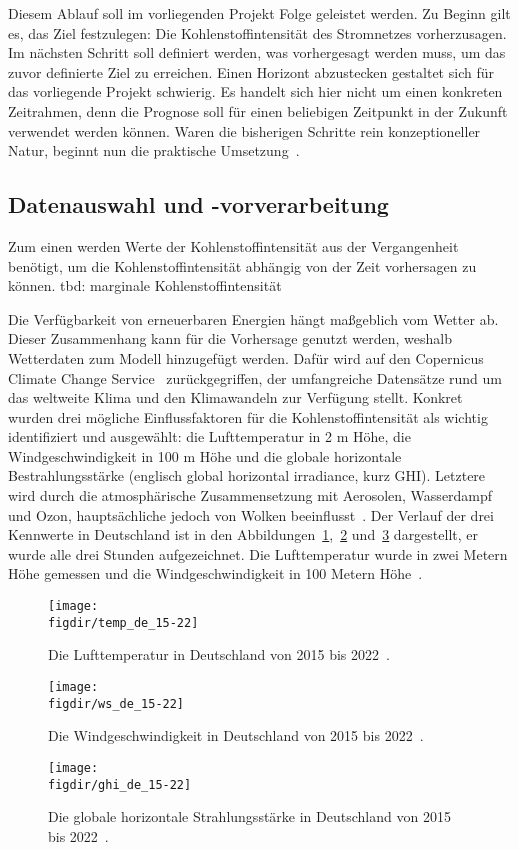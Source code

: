 Diesem Ablauf soll im vorliegenden Projekt Folge geleistet werden.
Zu Beginn gilt es, das Ziel festzulegen: Die Kohlenstoffintensität des Stromnetzes vorherzusagen.
Im nächsten Schritt soll definiert werden, was vorhergesagt werden muss, um das zuvor definierte Ziel zu erreichen.
Einen Horizont abzustecken gestaltet sich für das vorliegende Projekt schwierig.
Es handelt sich hier nicht um einen konkreten Zeitrahmen, denn die Prognose soll für einen beliebigen Zeitpunkt in der Zukunft verwendet werden können.
Waren die bisherigen Schritte rein konzeptioneller Natur, beginnt nun die praktische Umsetzung~\cite{Peixeiro.2022}.


\subsection{Datenauswahl und -vorverarbeitung}
Zum einen werden Werte der Kohlenstoffintensität aus der Vergangenheit benötigt, um die Kohlenstoffintensität abhängig von der Zeit vorhersagen zu können.
tbd: marginale Kohlenstoffintensität

Die Verfügbarkeit von erneuerbaren Energien hängt maßgeblich vom Wetter ab.
Dieser Zusammenhang kann für die Vorhersage genutzt werden, weshalb Wetterdaten zum Modell hinzugefügt werden.
Dafür wird auf den Copernicus Climate Change Service~\cite{Copernicus.20231212T14:09:40.000Z} zurückgegriffen, der umfangreiche Datensätze rund um das weltweite Klima und den Klimawandeln zur Verfügung stellt.
Konkret wurden drei mögliche Einflussfaktoren für die Kohlenstoffintensität als wichtig identifiziert und ausgewählt: die Lufttemperatur in 2 m Höhe, die Windgeschwindigkeit in 100 m Höhe und die globale horizontale Bestrahlungsstärke (englisch global horizontal irradiance, kurz GHI).
Letztere wird durch die atmosphärische Zusammensetzung mit Aerosolen, Wasserdampf und Ozon, hauptsächliche jedoch von Wolken beeinflusst~\cite{KallioMyers.2020}.
Der Verlauf der drei Kennwerte in Deutschland ist in den Abbildungen~\ref{FIG:temp_de_2015-2022},~\ref{FIG:ws_de_2015-2022} und~\ref{FIG:ghi_de_2015-2022} dargestellt, er wurde alle drei Stunden aufgezeichnet.
Die Lufttemperatur wurde in zwei Metern Höhe gemessen und die Windgeschwindigkeit in 100 Metern Höhe~\cite{Copernicus.20231212T14:09:40.000Z}.
\begin{figure}
 \caption{Die Lufttemperatur in Deutschland von 2015 bis 2022~\cite{Copernicus.20231212T14:09:40.000Z}.}
 {\texttt{[image: \\figdir/temp\_de\_15-22]}}
 \label{FIG:temp_de_2015-2022}
\end{figure}
\begin{figure}
 \caption{Die Windgeschwindigkeit in Deutschland von 2015 bis 2022~\cite{Copernicus.20231212T14:09:40.000Z}.}
 {\texttt{[image: \\figdir/ws\_de\_15-22]}}
 \label{FIG:ws_de_2015-2022}
\end{figure}
\begin{figure}
 \caption{Die globale horizontale Strahlungsstärke in Deutschland von 2015 bis 2022~\cite{Copernicus.20231212T14:09:40.000Z}.}
 {\texttt{[image: \\figdir/ghi\_de\_15-22]}}
 \label{FIG:ghi_de_2015-2022}
\end{figure}

